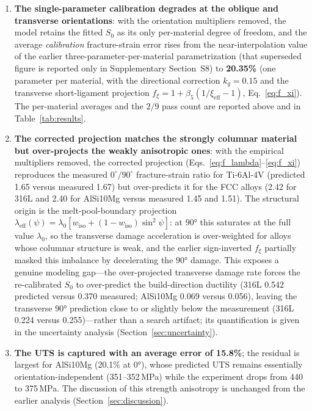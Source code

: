\documentclass[12pt,a4paper,twocolumn]{article}
\begin{document}
\begin{enumerate}\def\labelenumi{(\arabic{enumi})}
    \item \textbf{The single-parameter calibration degrades at the oblique and transverse orientations}: with the orientation multipliers removed, the model retains the fitted $S_0$ as its only per-material degree of freedom, and the average \emph{calibration} fracture-strain error rises from the near-interpolation value of the earlier three-parameter-per-material parametrization (that superseded figure is reported only in Supplementary Section~S8) to \textbf{20.35\%} (one parameter per material, with the directional correction $k_g=0.15$ and the transverse short-ligament projection $f_\xi = 1+\beta_5(1/\xi_\mathrm{eff}-1)$, Eq.~\eqref{eq:f_xi}). The per-material averages and the $2/9$ pass count are reported above and in Table~\ref{tab:results}.
    \item \textbf{The corrected projection matches the strongly columnar material but over-projects the weakly anisotropic ones}: with the empirical multipliers removed, the corrected projection (Eqs.~\eqref{eq:f_lambda}--\eqref{eq:f_xi}) reproduces the measured $0^\circ/90^\circ$ fracture-strain ratio for Ti-6Al-4V (predicted 1.65 versus measured 1.67) but over-predicts it for the FCC alloys (2.42 for 316L and 2.40 for AlSi10Mg versus measured 1.45 and 1.51). The structural origin is the melt-pool-boundary projection $\lambda_{\mathrm{eff}}(\psi) = \lambda_0 [w_{\mathrm{iso}} + (1-w_{\mathrm{iso}})\sin^2\psi]$: at $\ang{90}$ this saturates at the full value $\lambda_0$, so the transverse damage acceleration is over-weighted for alloys whose columnar structure is weak, and the earlier sign-inverted $f_\xi$ partially masked this imbalance by decelerating the $\ang{90}$ damage. This exposes a genuine modeling gap---the over-projected transverse damage rate forces the re-calibrated $S_0$ to over-predict the build-direction ductility (316L 0.542 predicted versus 0.370 measured; AlSi10Mg 0.069 versus 0.056), leaving the transverse $\ang{90}$ prediction close to or slightly below the measurement (316L 0.224 versus 0.255)---rather than a search artifact; its quantification is given in the uncertainty analysis (Section~\ref{sec:uncertainty}).
    \item \textbf{The UTS is captured with an average error of 15.8\%}; the residual is largest for AlSi10Mg (20.1\% at $\ang{0}$), whose predicted UTS remains essentially orientation-independent (351--352\,MPa) while the experiment drops from 440 to 375\,MPa. The discussion of this strength anisotropy is unchanged from the earlier analysis (Section~\ref{sec:discussion}).
\end{enumerate}
\end{document}

